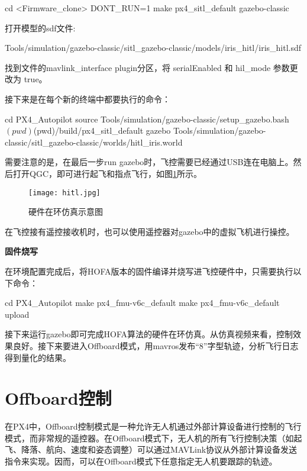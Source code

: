 \begin{codeblock}[language=C]
  cd <Firmware_clone>
  DONT_RUN=1 make px4_sitl_default gazebo-classic
\end{codeblock}


打开模型的sdf文件:

Tools/simulation/gazebo-classic/sitl\_gazebo-classic/models/iris\_hitl/iris\_hitl.sdf

找到文件的mavlink\_interface plugin分区，将 serialEnabled 和 hil\_mode 参数更改为 true。

接下来是在每个新的终端中都要执行的命令：
\begin{codeblock}[language=C]
  cd PX4_Autopilot
  source Tools/simulation/gazebo-classic/setup_gazebo.bash $(pwd) $(pwd)/build/px4_sitl_default
  gazebo Tools/simulation/gazebo-classic/sitl_gazebo-classic/worlds/hitl_iris.world
\end{codeblock}



需要注意的是，在最后一步run gazebo时，飞控需要已经通过USB连在电脑上。然后打开QGC，即可进行起飞和指点飞行，如图\ref{hitl}所示。
\begin{figure}[!h]
  \centering
  \texttt{[image: hitl.jpg]}
  \caption{硬件在环仿真示意图}
  \label{hitl}
\end{figure}

在飞控接有遥控接收机时，也可以使用遥控器对gazebo中的虚拟飞机进行操控。

\textbf{固件烧写}

在环境配置完成后，将HOFA版本的固件编译并烧写进飞控硬件中，只需要执行以下命令：
\begin{codeblock}[language=C]
  cd PX4_Autopilot
  make px4_fmu-v6c_default
  make px4_fmu-v6c_default upload
\end{codeblock}


接下来运行gazebo即可完成HOFA算法的硬件在环仿真。从仿真视频来看，控制效果良好。接下来要进入Offboard模式，用mavros发布“8”字型轨迹，分析飞行日志得到量化的结果。

\section{Offboard控制}

在PX4中，Offboard控制模式是一种允许无人机通过外部计算设备进行控制的飞行模式，而非常规的遥控器。在Offboard模式下，无人机的所有飞行控制决策（如起飞、降落、航向、速度和姿态调整）可以通过MAVLink协议从外部计算设备发送指令来实现。因而，可以在Offboard模式下任意指定无人机要跟踪的轨迹。

